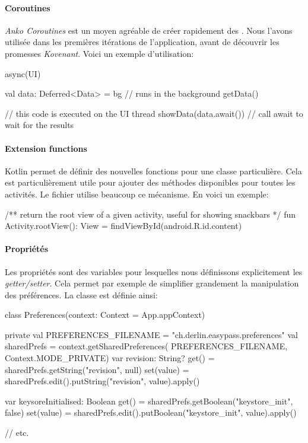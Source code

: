 \paragraph*{Coroutines} \emph{Anko Coroutines} est un moyen agréable de créer rapidement des . Nous l'avons utilisée dans les premières itérations de l'application, avant de découvrir les promesses \emph{Kovenant}. Voici un exemple d'utilisation:

\begin{kotlincode}
async(UI) {
    val data: Deferred<Data> = bg {
    // runs in the background
    getData()
    }

    // this code is executed on the UI thread
    showData(data.await()) // call await to wait for the results
}
\end{kotlincode}


\paragraph*{Extension functions} Kotlin permet de définir des nouvelles fonctions pour une classe particulière. Cela est particulièrement utile pour ajouter des méthodes disponibles pour toutes les activités. Le fichier  utilise beaucoup ce mécanisme. En voici un exemple:

\begin{kotlincode}
/** return the root view of a given activity, useful for showing snackbars */
fun Activity.rootView(): View = findViewById(android.R.id.content)
\end{kotlincode}

\paragraph*{Propriétés} Les propriétés sont des variables pour lesquelles nous définissons explicitement les \emph{getter/setter}. Cela permet par exemple de simplifier grandement la manipulation des préférences. La classe  est définie ainsi:

\begin{kotlincode}
class Preferences(context: Context = App.appContext) {

    private val PREFERENCES_FILENAME = "ch.derlin.easypass.preferences"
    val sharedPrefs = context.getSharedPreferences(
                        PREFERENCES_FILENAME, Context.MODE_PRIVATE)
    var revision: String?
        get() = sharedPrefs.getString("revision", null)
        set(value) = sharedPrefs.edit().putString("revision", value).apply()
                
    var keysoreInitialised: Boolean
        get() = sharedPrefs.getBoolean("keystore_init", false)
        set(value) = sharedPrefs.edit().putBoolean("keystore_init", value).apply()

    // etc. 
}
\end{kotlincode}

